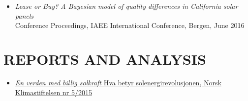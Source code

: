 \documentclass[margin]{res}
\begin{document}
\begin{resume}
\begin{itemize}
\item[] \emph{Lease or Buy? A Bayesian model of quality differences in California solar panels}\\
Conference Proceedings, IAEE International Conference, Bergen, June 2016
\end{itemize}


\section{REPORTS AND ANALYSIS}
\begin{itemize}
\setlength{\itemsep}{5pt}
\item[] \href{http://klimastiftelsen.no/wp-content/uploads/2015/06/NK5_2015_Solenergirevolusjonen.pdf}{\emph{En verden med billig solkraft} Hva betyr solenergirevolusjonen, Norsk Klimastiftelsen nr 5/2015}
\end{itemize}


\end{resume}
\end{document}
